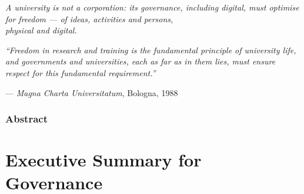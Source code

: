 \documentclass[11pt,a4paper,twoside]{book}
\let\oldsection\section
\begin{document}
\begin{titlepage}
\vfill

\begin{tcolorbox}[
    colback=BrickRed!8!white,
    colframe=BrickRed!75!black,
    boxrule=1.2pt,
    arc=3pt,
    left=12pt, right=12pt, top=8pt, bottom=8pt,
    width=0.88\textwidth,
    halign=center
]
{\normalsize\itshape A university is not a corporation: its governance, including digital,
must optimise for freedom --- of ideas, activities and persons,\\physical and digital.}
\end{tcolorbox}

\vspace{0.4cm}

\begin{minipage}{0.85\textwidth}
\centering\small\itshape
``Freedom in research and training is the fundamental principle of university life, and governments and universities, each as far as in them lies, must ensure respect for this fundamental requirement.''

\upshape\smallskip
--- \textit{Magna Charta Universitatum}, Bologna, 1988~\cite{magna-charta}
\end{minipage}

\vspace{2cm}

\end{titlepage}

\frontmatter
\hypersetup{pageanchor=true}

\section*{Abstract}

\newpage

\tableofcontents

\mainmatter

\part{Executive Summary for Governance}
\label{part:companion}

\setcounter{secnumdepth}{0}
\renewcommand{\section}{\oldsection}
\glsresetall
\end{document}
